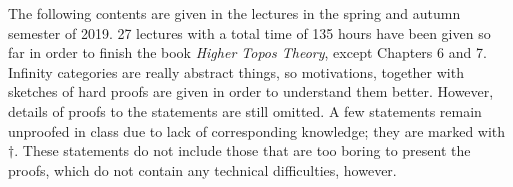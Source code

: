 The following contents are given in the lectures in the spring and autumn semester of 2019. 27 lectures with a total time of 135 hours 
have been given so far in order to finish the book \textit{Higher Topos Theory}, except Chapters 6 and 7. Infinity categories are
really abstract things, so motivations, together with sketches of hard proofs are given in order to understand them better. 
However, details of proofs to the statements are still omitted. A few statements 
remain unproofed in class due to lack of corresponding knowledge; they are marked with $\dagger$. These statements do not include 
those that are too boring to present the proofs, which do not contain any technical difficulties, however. 